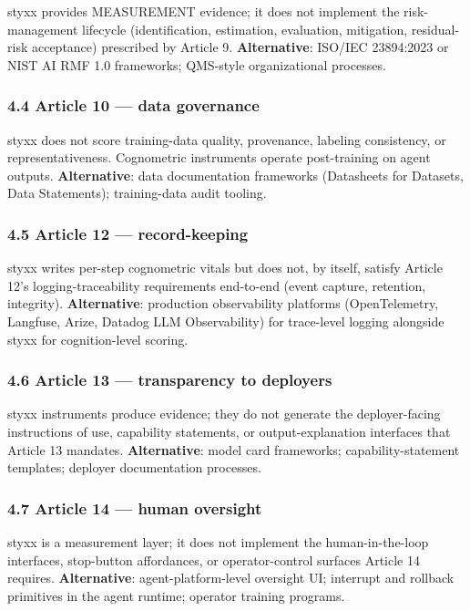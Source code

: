 \documentclass[
]{article}
\begin{document}
styxx provides MEASUREMENT evidence; it does not implement the
risk-management lifecycle (identification, estimation, evaluation,
mitigation, residual-risk acceptance) prescribed by Article 9.
\textbf{Alternative}: ISO/IEC 23894:2023 or NIST AI RMF 1.0 frameworks;
QMS-style organizational processes.

\subsubsection{4.4 Article 10 --- data
governance}\label{article-10-data-governance}

styxx does not score training-data quality, provenance, labeling
consistency, or representativeness. Cognometric instruments operate
post-training on agent outputs. \textbf{Alternative}: data documentation
frameworks (Datasheets for Datasets, Data Statements); training-data
audit tooling.

\subsubsection{4.5 Article 12 ---
record-keeping}\label{article-12-record-keeping}

styxx writes per-step cognometric vitals but does not, by itself,
satisfy Article 12's logging-traceability requirements end-to-end (event
capture, retention, integrity). \textbf{Alternative}: production
observability platforms (OpenTelemetry, Langfuse, Arize, Datadog LLM
Observability) for trace-level logging alongside styxx for
cognition-level scoring.

\subsubsection{4.6 Article 13 --- transparency to
deployers}\label{article-13-transparency-to-deployers}

styxx instruments produce evidence; they do not generate the
deployer-facing instructions of use, capability statements, or
output-explanation interfaces that Article 13 mandates.
\textbf{Alternative}: model card frameworks; capability-statement
templates; deployer documentation processes.

\subsubsection{4.7 Article 14 --- human
oversight}\label{article-14-human-oversight}

styxx is a measurement layer; it does not implement the
human-in-the-loop interfaces, stop-button affordances, or
operator-control surfaces Article 14 requires. \textbf{Alternative}:
agent-platform-level oversight UI; interrupt and rollback primitives in
the agent runtime; operator training programs.
\end{document}
